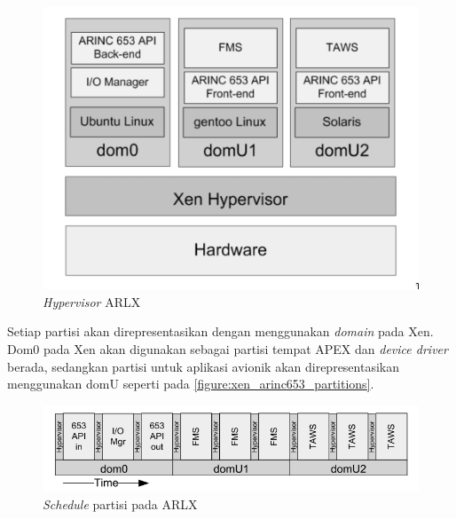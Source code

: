 \begin{figure}[!ht]
    \centering
    \includegraphics[scale=0.6]{resources/xen-arinc653-partitions.png}
    \vspace{10pt}
    \caption{\textit{Hypervisor} ARLX \citep{VanderLeest2010}}
    \label{figure:xen_arinc653_partitions}
\end{figure}

Setiap partisi akan direpresentasikan dengan menggunakan \textit{domain} pada Xen.  Dom0 pada
Xen akan digunakan sebagai partisi tempat APEX dan \textit{device driver} berada, sedangkan
partisi untuk aplikasi avionik akan direpresentasikan menggunakan domU seperti pada
\autoref{figure:xen_arinc653_partitions}.

\begin{figure}[!hb]
    \includegraphics[scale=0.6]{resources/xen-arinc653-partition-schedule.png}
    \vspace{15pt}
    \caption{\textit{Schedule} partisi pada ARLX \citep{VanderLeest2010}}
    \label{figure:xen_arinc653_partitions_schedule}
\end{figure}


